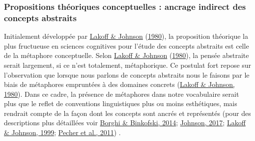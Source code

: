 \documentclass[
  a4paper,12pt,twoside,onecolumn,openright,final,oldfontcommands]{memoir}
\begin{document}
\hypertarget{metaphor}{%
\subsubsection{Propositions théoriques conceptuelles : ancrage indirect des concepts abstraits}\label{metaphor}}

Initialement développée par \protect\hyperlink{ref-lakoff_metaphors_1980}{Lakoff \& Johnson} (\protect\hyperlink{ref-lakoff_metaphors_1980}{1980}), la proposition théorique la plus fructueuse en sciences cognitives pour l'étude des concepts abstraits est celle de la métaphore conceptuelle. Selon \protect\hyperlink{ref-lakoff_metaphors_1980}{Lakoff \& Johnson} (\protect\hyperlink{ref-lakoff_metaphors_1980}{1980}), la pensée abstraite serait largement, si ce n'est totalement, métaphorique. Ce postulat fort repose sur l'observation que lorsque nous parlons de concepts abstraits nous le faisons par le biais de métaphores empruntées à des domaines concrets (\protect\hyperlink{ref-lakoff_metaphors_1980}{Lakoff \& Johnson, 1980}). Dans ce cadre, la présence de métaphores dans notre vocabulaire serait plus que le reflet de conventions linguistiques plus ou moins esthétiques, mais rendrait compte de la façon dont les concepts sont ancrés et représentés (pour des descriptions plus détaillées voir \protect\hyperlink{ref-borghi_words_2014}{Borghi \& Binkofski, 2014}; \protect\hyperlink{ref-johnson_embodied_2017}{Johnson, 2017}; \protect\hyperlink{ref-lakoff_philosophy_1999}{Lakoff \& Johnson, 1999}; \protect\hyperlink{ref-pecher_abstract_2011}{Pecher et al., 2011}) .
\end{document}

